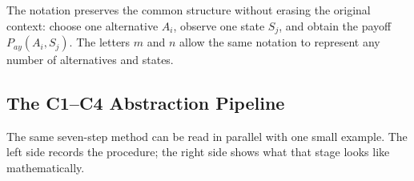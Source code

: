 \begin{center}
{%
		}
	\end{center}
	
	The notation preserves the common structure without erasing the original
	context: choose one alternative \(A_i\), observe one state \(S_j\), and obtain
	the payoff \(P_{ay}(A_i,S_j)\). The letters \(m\) and \(n\) allow the same notation
	to represent any number of alternatives and states.
	
	
	
	\subsection{The C1--C4 Abstraction Pipeline}
	\label{sec:abstraction-pipeline}
	
	The same seven-step method can be read in parallel with one small example.
	The left side records the procedure; the right side shows what that stage
	looks like mathematically.
	
